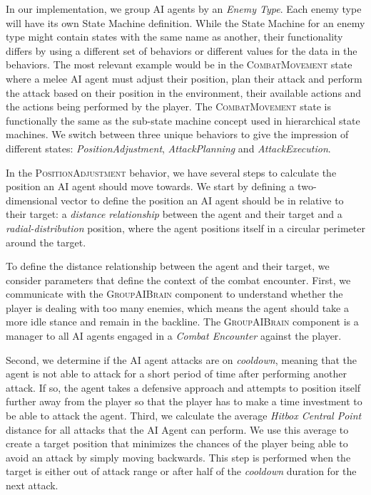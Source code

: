 In our implementation, we group AI agents by an \emph{Enemy Type}. Each enemy type will have its own State Machine definition. While the State Machine for an enemy type might contain states with the same name as another, their functionality differs by using a different set of behaviors or different values for the data in the behaviors. The most relevant example would be in the \textsc{CombatMovement} state where a melee AI agent must adjust their position, plan their attack and perform the attack based on their position in the environment, their available actions and the actions being performed by the player. The \textsc{CombatMovement} state is functionally the same as the sub-state machine concept used in hierarchical state machines. We switch between three unique behaviors to give the impression of different states: \emph{PositionAdjustment}, \emph{AttackPlanning} and \emph{AttackExecution}.

In the \textsc{PositionAdjustment} behavior, we have several steps to calculate the position an AI agent should move towards. We start by defining a two-dimensional vector to define the position an AI agent should be in relative to their target: a \emph{distance relationship} between the agent and their target and a \emph{radial-distribution} position, where the agent positions itself in a circular perimeter around the target.

To define the distance relationship between the agent and their target, we consider parameters that define the context of the combat encounter. First, we communicate with the \textsc{GroupAIBrain} component to understand whether the player is dealing with too many enemies, which means the agent should take a more idle stance and remain in the backline. The \textsc{GroupAIBrain} component is a manager to all AI agents engaged in a \emph{Combat Encounter} against the player.


Second, we determine if the AI agent attacks are on \emph{cooldown}, meaning that the agent is not able to attack for a short period of time after performing another attack. If so, the agent takes a defensive approach and attempts to position itself further away from the player so that the player has to make a time investment to be able to attack the agent. Third, we calculate the average \emph{Hitbox Central Point} distance for all attacks that the AI Agent can perform. We use this average to create a target position that minimizes the chances of the player being able to avoid an attack by simply moving backwards. This step is performed when the target is either out of attack range or after half of the \emph{cooldown} duration for the next attack.

